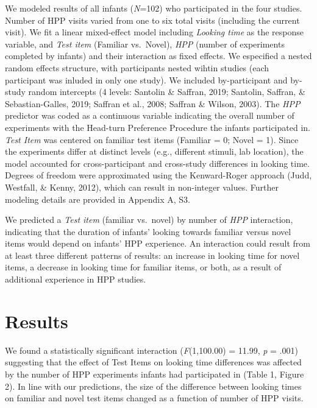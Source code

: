 \documentclass[english,man,man,floatsintext]{apa6}
\begin{document}
We modeled results of all infants (\emph{N}=102) who participated in the four studies. Number of HPP visits varied from one to six total visits (including the current visit). We fit a linear mixed-effect model including \emph{Looking time} as the response variable, and \emph{Test item} (Familiar vs.~Novel), \emph{HPP} (number of experiments completed by infants) and their interaction as fixed effects. We especified a nested random effects structure, with participants nested wihtin studies (each participant was inluded in only one study). We included by-participant and by-study random intercepts (4 levels: Santolin \& Saffran, 2019; Santolin, Saffran, \& Sebastian-Galles, 2019; Saffran et al., 2008; Saffran \& Wilson, 2003). The \emph{HPP} predictor was coded as a continuous variable indicating the overall number of experiments with the Head-turn Preference Procedure the infants participated in. \emph{Test Item }was centered on familiar test items (Familiar = 0; Novel = 1). Since the experiments differ at distinct levels (e.g., different stimuli, lab location), the model accounted for cross-participant and cross-study differences in looking time. Degrees of freedom were approximated using the Kenward-Roger approach (Judd, Westfall, \& Kenny, 2012), which can result in non-integer values. Further modeling details are provided in Appendix A, S3.

We predicted a \emph{Test item} (familiar vs.~novel) by number of \emph{HPP} interaction, indicating that the duration of infants' looking towards familiar versus novel items would depend on infants' HPP experience. An interaction could result from at least three different patterns of results: an increase in looking time for novel items, a decrease in looking time for familiar items, or both, as a result of additional experience in HPP studies.

\hypertarget{results}{%
\section{Results}\label{results}}

We found a statistically significant interaction (\emph{F}(1,100.00) = 11.99, \emph{p} = .001) suggesting that the effect of Test Items on looking time differences was affected by the number of HPP experiments infants had participated in (Table 1, Figure 2). In line with our predictions, the size of the difference between looking times on familiar and novel test items changed as a function of number of HPP visits.
\end{document}
